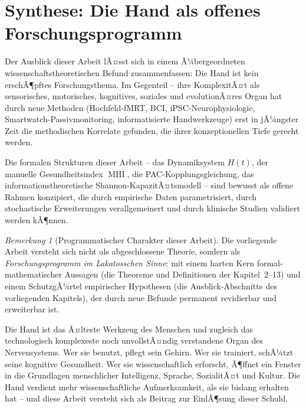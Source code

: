 ﻿\documentclass[12pt,a4paper]{report}
\theoremstyle{plain}
\theoremstyle{definition}
\theoremstyle{remark}
\newtheorem{bemerkung}[theorem]{Bemerkung}
\DeclareMathOperator{\MHI}{MHI}
\begin{document}
\section{Synthese: Die Hand als offenes Forschungsprogramm}

Der Ausblick dieser Arbeit lÃ¤sst sich in einem Ã¼bergeordneten
wissenschaftstheoretischen Befund zusammenfassen: Die Hand ist kein
erschÃ¶pftes Forschungsthema. Im Gegenteil -- ihre KomplexitÃ¤t als
sensorisches, motorisches, kognitives, soziales und evolutionÃ¤res Organ
hat durch neue Methoden (Hochfeld-fMRT, BCI, iPSC-Neurophysiologie,
Smartwatch-Passivmonitoring, informatisierte Handwerkzeuge) erst in
jÃ¼ngster Zeit die methodischen Korrelate gefunden, die ihrer konzeptionellen
Tiefe gerecht werden.

Die formalen Strukturen dieser Arbeit -- das Dynamiksystem $H(t)$,
der manuelle Gesundheitsindex $\MHI$, die PAC-Kopplungsgleichung,
das informationstheoretische Shannon-KapazitÃ¤tsmodell -- sind bewusst
als offene Rahmen konzipiert, die durch empirische Daten parametrisiert,
durch stochastische Erweiterungen verallgemeinert und durch klinische
Studien validiert werden kÃ¶nnen.

\begin{bemerkung}[Programmatischer Charakter dieser Arbeit]
Die vorliegende Arbeit versteht sich nicht als abgeschlossene
Theorie, sondern als \emph{Forschungsprogramm im Lakatosschen Sinne}:
mit einem harten Kern formal-mathematischer Aussagen (die
Theoreme und Definitionen der Kapitel~2--13) und einem
SchutzgÃ¼rtel empirischer Hypothesen (die Ausblick-Abschnitte
des vorliegenden Kapitels), der durch neue Befunde permanent
revidierbar und erweiterbar ist.
\end{bemerkung}

Die Hand ist das Ã¤lteste Werkzeug des Menschen und zugleich das
technologisch komplexeste noch unvollstÃ¤ndig verstandene Organ des
Nervensystems. Wer sie benutzt, pflegt sein Gehirn. Wer sie trainiert,
schÃ¼tzt seine kognitive Gesundheit. Wer sie wissenschaftlich erforscht,
Ã¶ffnet ein Fenster in die Grundlagen menschlicher Intelligenz, Sprache,
SozialitÃ¤t und Kultur. Die Hand verdient mehr wissenschaftliche
Aufmerksamkeit, als sie bislang erhalten hat -- und diese Arbeit
versteht sich als Beitrag zur EinlÃ¶sung dieser Schuld.
\end{document}
